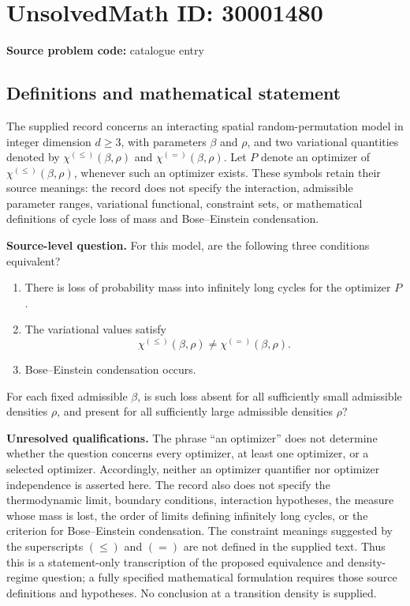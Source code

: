 \documentclass[11pt]{article}
\begin{document}
\section*{UnsolvedMath ID: 30001480}
\textbf{Source problem code:} catalogue entry
\subsection{Definitions and mathematical statement}
The supplied record concerns an interacting spatial random-permutation model in integer dimension \(d\geq 3\), with parameters \(\beta\) and \(\rho\), and two variational quantities denoted by \(\chi^{(\leq)}(\beta,\rho)\) and \(\chi^{(=)}(\beta,\rho)\). Let \(P\) denote an optimizer of \(\chi^{(\leq)}(\beta,\rho)\), whenever such an optimizer exists. These symbols retain their source meanings: the record does not specify the interaction, admissible parameter ranges, variational functional, constraint sets, or mathematical definitions of cycle loss of mass and Bose--Einstein condensation.

\textbf{Source-level question.} For this model, are the following three conditions equivalent?
\begin{enumerate}
\item There is loss of probability mass into infinitely long cycles for the optimizer \(P\).
\item The variational values satisfy
\[
\chi^{(\leq)}(\beta,\rho)\neq\chi^{(=)}(\beta,\rho).
\]
\item Bose--Einstein condensation occurs.
\end{enumerate}
For each fixed admissible \(\beta\), is such loss absent for all sufficiently small admissible densities \(\rho\), and present for all sufficiently large admissible densities \(\rho\)?

\textbf{Unresolved qualifications.} The phrase ``an optimizer'' does not determine whether the question concerns every optimizer, at least one optimizer, or a selected optimizer. Accordingly, neither an optimizer quantifier nor optimizer independence is asserted here. The record also does not specify the thermodynamic limit, boundary conditions, interaction hypotheses, the measure whose mass is lost, the order of limits defining infinitely long cycles, or the criterion for Bose--Einstein condensation. The constraint meanings suggested by the superscripts \((\leq)\) and \((=)\) are not defined in the supplied text. Thus this is a statement-only transcription of the proposed equivalence and density-regime question; a fully specified mathematical formulation requires those source definitions and hypotheses. No conclusion at a transition density is supplied.
\end{document}
